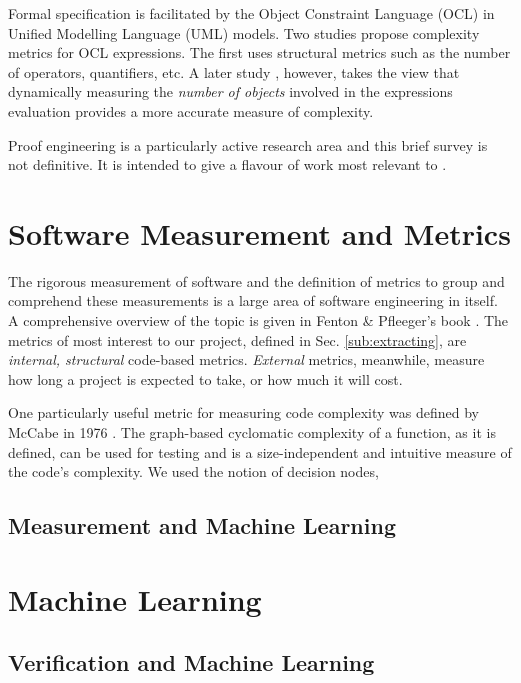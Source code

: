 Formal specification is facilitated by the Object Constraint Language (OCL) in Unified Modelling Language (UML) models. Two studies propose complexity metrics for OCL expressions. The first \cite{TowardsOCL} uses structural metrics such as the number of operators, quantifiers, etc. A later study \cite{OCLalt}, however, takes the view that dynamically measuring the \textit{number of objects} involved in the expressions evaluation provides a more accurate measure of complexity.

Proof engineering is a particularly active research area and this brief survey is not definitive. It is intended to give a flavour of work most relevant to \where.     
 
       
\section{Software Measurement and Metrics}
\label{sec:lrmm}
The rigorous measurement of software and the definition of metrics to group and comprehend these measurements is a large area of software engineering in itself. A comprehensive overview of the topic is given in Fenton \& Pfleeger's book \cite{FentonPfleeger}. The metrics of most interest to our project, defined in Sec. \ref{sub:extracting}, are \textit{internal, structural} code-based metrics. \textit{External} metrics, meanwhile, measure how long a project is expected to take, or how much it will cost. 

One particularly useful metric for measuring code complexity was defined by McCabe in 1976 \cite{McCabe}. The graph-based cyclomatic complexity of a function,  as it is defined, can be used for testing and is a size-independent and intuitive measure of the code's complexity. We used the notion of decision nodes, \cite{nuimeprn6458}   


\subsection{Measurement and Machine Learning}
\label{sub:lrmmml}

\section{Machine Learning}
\label{sec:lrml}

\subsection{Verification and Machine Learning}
\label{sub:lrsvml}


